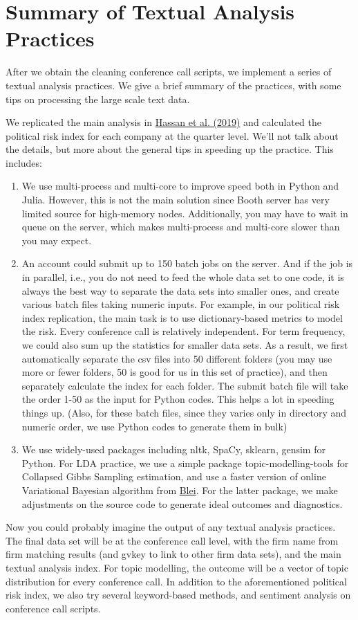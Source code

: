\documentclass[11pt]{article}
\newcounter{file}
\begin{document}
\section{Summary of Textual Analysis Practices}
\par After we obtain the cleaning conference call scripts, we implement a series of textual analysis practices. We give a brief summary of the practices, with some tips on processing the large scale text data.
\par We replicated the main analysis in \href{https://drive.google.com/file/d/1D7wNA31oltU4yndcLWw3Eo3LPJltEXg_/view?usp=sharing}{Hassan et al. (2019)} and calculated the political risk index for each company at the quarter level. We'll not talk about the details, but more about the general tips in speeding up the practice. This includes:
\begin{enumerate}
	\item We use multi-process and multi-core to improve speed both in Python and Julia. However, this is not the main solution since Booth server has very limited source for high-memory nodes. Additionally, you may have to wait in queue on the server, which makes multi-process and multi-core slower than you may expect.
	\item An account could submit up to 150 batch jobs on the server. And if the job is in parallel, i.e., you do not need to feed the whole data set to one code, it is always the best way to separate the data sets into smaller ones, and create various batch files taking numeric inputs. For example, in our political risk index replication, the main task is to use dictionary-based metrics to model the risk. Every conference call is relatively independent. For term frequency, we could also sum up the statistics for smaller data sets. As a result, we first automatically separate the csv files into 50 different folders (you may use more or fewer folders, 50 is good for us in this set of practice), and then separately calculate the index for each folder. The submit batch file will take the order 1-50 as the input for Python codes. This helps a lot in speeding things up. (Also, for these batch files, since they varies only in directory and numeric order, we use Python codes to generate them in bulk)
	\item We use widely-used packages including nltk, SpaCy, sklearn, gensim for Python. For LDA practice, we use a simple package topic-modelling-tools for Collapsed Gibbs Sampling estimation, and use a faster version of online Variational Bayesian algorithm from \href{https://github.com/blei-lab/onlineldavb}{Blei}. For the latter package, we make adjustments on the source code to generate ideal outcomes and diagnostics.
\end{enumerate}
\par Now you could probably imagine the output of any textual analysis practices. The final data set will be at the conference call level, with the firm name from firm matching results (and gvkey to link to other firm data sets), and the main textual analysis index. For topic modelling, the outcome will be a vector of topic distribution for every conference call. In addition to the aforementioned political risk index, we also try several keyword-based methods, and sentiment analysis on conference call scripts.
\end{document}
